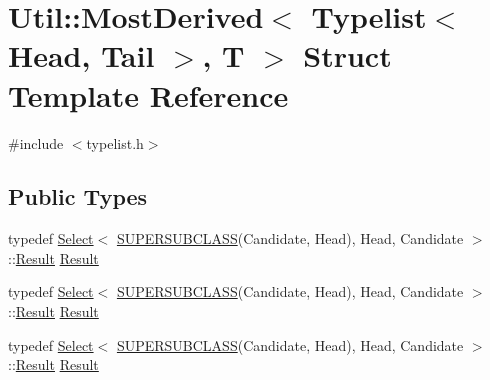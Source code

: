 \hypertarget{structUtil_1_1TL_1_1MostDerived_3_01Typelist_3_01Head_00_01Tail_01_4_00_01T_01_4}{}\section{Util\+:\+:Most\+Derived$<$ Typelist$<$ Head, Tail $>$, T $>$ Struct Template Reference}
\label{structUtil_1_1TL_1_1MostDerived_3_01Typelist_3_01Head_00_01Tail_01_4_00_01T_01_4}


{\ttfamily \#include $<$typelist.\+h$>$}

\subsection*{Public Types}
\begin{DoxyCompactItemize}
\item 
typedef \mbox{\hyperlink{structUtil_1_1Select}{Select}}$<$ \mbox{\hyperlink{adat__devel__install_2include_2adat_2typemanip_8h_a2820bb39352560126da663542139bd9b}{S\+U\+P\+E\+R\+S\+U\+B\+C\+L\+A\+SS}}(Candidate, Head), Head, Candidate $>$\+::\mbox{\hyperlink{structUtil_1_1TL_1_1MostDerived_3_01Typelist_3_01Head_00_01Tail_01_4_00_01T_01_4_a70c1999c1e1c8426f47682c8a0289724}{Result}} \mbox{\hyperlink{structUtil_1_1TL_1_1MostDerived_3_01Typelist_3_01Head_00_01Tail_01_4_00_01T_01_4_a70c1999c1e1c8426f47682c8a0289724}{Result}}
\item 
typedef \mbox{\hyperlink{structUtil_1_1Select}{Select}}$<$ \mbox{\hyperlink{adat__devel__install_2include_2adat_2typemanip_8h_a2820bb39352560126da663542139bd9b}{S\+U\+P\+E\+R\+S\+U\+B\+C\+L\+A\+SS}}(Candidate, Head), Head, Candidate $>$\+::\mbox{\hyperlink{structUtil_1_1TL_1_1MostDerived_3_01Typelist_3_01Head_00_01Tail_01_4_00_01T_01_4_a70c1999c1e1c8426f47682c8a0289724}{Result}} \mbox{\hyperlink{structUtil_1_1TL_1_1MostDerived_3_01Typelist_3_01Head_00_01Tail_01_4_00_01T_01_4_a70c1999c1e1c8426f47682c8a0289724}{Result}}
\item 
typedef \mbox{\hyperlink{structUtil_1_1Select}{Select}}$<$ \mbox{\hyperlink{adat__devel__install_2include_2adat_2typemanip_8h_a2820bb39352560126da663542139bd9b}{S\+U\+P\+E\+R\+S\+U\+B\+C\+L\+A\+SS}}(Candidate, Head), Head, Candidate $>$\+::\mbox{\hyperlink{structUtil_1_1TL_1_1MostDerived_3_01Typelist_3_01Head_00_01Tail_01_4_00_01T_01_4_a70c1999c1e1c8426f47682c8a0289724}{Result}} \mbox{\hyperlink{structUtil_1_1TL_1_1MostDerived_3_01Typelist_3_01Head_00_01Tail_01_4_00_01T_01_4_a70c1999c1e1c8426f47682c8a0289724}{Result}}
\end{DoxyCompactItemize}


